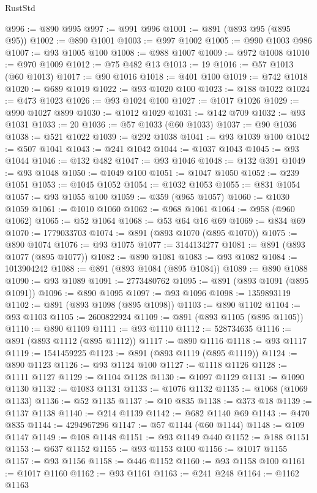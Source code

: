 \begin{lexlean}{RustStd}
\begin{coremodule}
@996 := @890 @995
@997 := @991 @996
@1001 := @891 (@893 @95 (@895 @95))
@1002 := @890 @1001
@1003 := @997 @1002
@1005 := @990 @1003 @986
@1007 := @93 @1005 @100
@1008 := @988 @1007
@1009 := @972 @1008
@1010 := @970 @1009
@1012 := @75 @482 @13
@1013 := 19
@1016 := @57 @1013 (@60 @1013)
@1017 := @90 @1016
@1018 := @401 @100
@1019 := @742 @1018
@1020 := @689 @1019
@1022 := @93 @1020 @100
@1023 := @188 @1022
@1024 := @473 @1023
@1026 := @93 @1024 @100
@1027 := @1017 @1026
@1029 := @990 @1027 @899
@1030 := @1012 @1029
@1031 := @142 @709
@1032 := @93 @1031
@1033 := 20
@1036 := @57 @1033 (@60 @1033)
@1037 := @90 @1036
@1038 := @521 @1022
@1039 := @292 @1038
@1041 := @93 @1039 @100
@1042 := @507 @1041
@1043 := @241 @1042
@1044 := @1037 @1043
@1045 := @93 @1044
@1046 := @132 @482
@1047 := @93 @1046
@1048 := @132 @391
@1049 := @93 @1048
@1050 := @1049 @100
@1051 := @1047 @1050
@1052 := @239 @1051
@1053 := @1045 @1052
@1054 := @1032 @1053
@1055 := @831 @1054
@1057 := @93 @1055 @100
@1059 := @359 (@965 @1057)
@1060 := @1030 @1059
@1061 := @1010 @1060
@1062 := @968 @1061
@1064 := @958 (@960 @1062)
@1065 := @52 @1064
@1068 := @53 @64 @16 @69
@1069 := @834 @69
@1070 := 1779033703
@1074 := @891 (@893 @1070 (@895 @1070))
@1075 := @890 @1074
@1076 := @93 @1075
@1077 := 3144134277
@1081 := @891 (@893 @1077 (@895 @1077))
@1082 := @890 @1081
@1083 := @93 @1082
@1084 := 1013904242
@1088 := @891 (@893 @1084 (@895 @1084))
@1089 := @890 @1088
@1090 := @93 @1089
@1091 := 2773480762
@1095 := @891 (@893 @1091 (@895 @1091))
@1096 := @890 @1095
@1097 := @93 @1096
@1098 := 1359893119
@1102 := @891 (@893 @1098 (@895 @1098))
@1103 := @890 @1102
@1104 := @93 @1103
@1105 := 2600822924
@1109 := @891 (@893 @1105 (@895 @1105))
@1110 := @890 @1109
@1111 := @93 @1110
@1112 := 528734635
@1116 := @891 (@893 @1112 (@895 @1112))
@1117 := @890 @1116
@1118 := @93 @1117
@1119 := 1541459225
@1123 := @891 (@893 @1119 (@895 @1119))
@1124 := @890 @1123
@1126 := @93 @1124 @100
@1127 := @1118 @1126
@1128 := @1111 @1127
@1129 := @1104 @1128
@1130 := @1097 @1129
@1131 := @1090 @1130
@1132 := @1083 @1131
@1133 := @1076 @1132
@1135 := @1068 (@1069 @1133)
@1136 := @52 @1135
@1137 := @10 @835
@1138 := @373 @18
@1139 := @1137 @1138
@1140 := @214 @1139
@1142 := @682 @1140 @69
@1143 := @470 @835
@1144 := 4294967296
@1147 := @57 @1144 (@60 @1144)
@1148 := @109 @1147
@1149 := @108 @1148
@1151 := @93 @1149 @440
@1152 := @188 @1151
@1153 := @637 @1152
@1155 := @93 @1153 @100
@1156 := @1017 @1155
@1157 := @93 @1156
@1158 := @446 @1152
@1160 := @93 @1158 @100
@1161 := @1017 @1160
@1162 := @93 @1161
@1163 := @241 @248
@1164 := @1162 @1163

\end{coremodule}
\end{lexlean}
